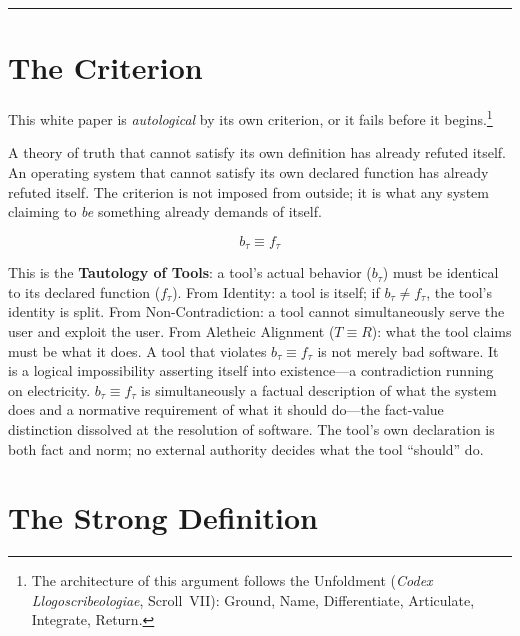 \documentclass[11pt, oneside]{article}
\begin{document}
\vspace{1em}
{\color{LogosGray}\centering\rule{0.45\textwidth}{0.4pt}\par}
\vspace{1.2em}

\section{The Criterion}

\noindent This white paper is \textit{autological} by its own criterion,
or it fails before it begins.\footnote{The architecture of this argument
follows the Unfoldment (\textit{Codex Llogoscribeologiae}, Scroll~VII):
Ground, Name, Differentiate, Articulate, Integrate, Return.}

A theory of truth that cannot satisfy its own definition has
already refuted itself. An operating system that cannot satisfy its own
declared function has already refuted itself. The criterion is not imposed
from outside; it is what any system claiming to \textit{be} something
already demands of itself.

\[
\boxed{b_\tau \equiv f_\tau}
\]

\noindent This is the \textbf{Tautology of Tools}: a tool's actual
behavior ($b_\tau$) must be identical to its declared function ($f_\tau$).
From Identity: a tool is itself; if $b_\tau \neq f_\tau$, the tool's
identity is split. From Non-Contradiction: a tool cannot simultaneously
serve the user and exploit the user. From Aletheic Alignment ($T \equiv
R$): what the tool claims must be what it does. A tool that violates $b_\tau \equiv f_\tau$
is not merely bad software. It is a logical impossibility asserting
itself into existence---a contradiction running on electricity.
$b_\tau \equiv f_\tau$ is simultaneously a factual description of what
the system does and a normative requirement of what it should do---the
fact-value distinction dissolved at the resolution of software. The
tool's own declaration is both fact and norm; no external authority
decides what the tool ``should'' do.

\section{The Strong Definition}
\end{document}
